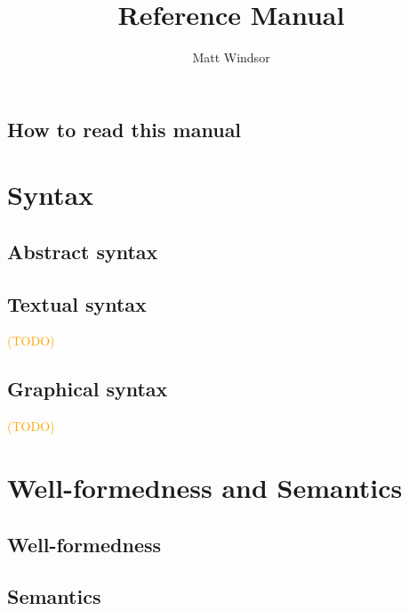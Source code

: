 \documentclass[a4paper]{memoir}
\title{\langname{} Reference Manual}
\author{Matt Windsor}
\newcommand{\todo}[1]{\textcolor{orange}{(#1)}}
\theoremstyle{definition}
\begin{document}
\pagestyle{sruled}

\frontmatter

\begin{titlingpage}
\setlength{\droptitle}{30pt}
\maketitle
\end{titlingpage}

\tableofcontents{}

\clearpage

\chapter*{How to read this manual}


\mainmatter

\part{Syntax}

\chapter{Abstract syntax}\label{cha:metamodel}


\chapter{Textual syntax}\label{cha:textual}
\todo{TODO}

\chapter{Graphical syntax}\label{cha:graphical}
\todo{TODO}

\part{Well-formedness and Semantics}

\chapter{Well-formedness}\label{cha:wf}


\chapter{Semantics}\label{cha:semantics}




\end{document}
